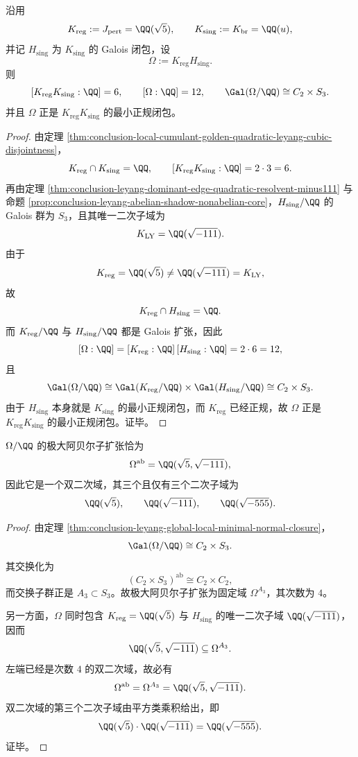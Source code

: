 \begin{theorem}\label{thm:conclusion-leyang-global-local-minimal-normal-closure}
沿用
\[
K_{\mathrm{reg}}:=J_{\mathrm{pert}}=\QQ(\sqrt5),
\qquad
K_{\mathrm{sing}}:=K_{\mathrm{br}}=\QQ(u),
\]
并记 \(H_{\mathrm{sing}}\) 为 \(K_{\mathrm{sing}}\) 的 Galois 闭包，设
\[
\Omega:=K_{\mathrm{reg}}H_{\mathrm{sing}}.
\]
则
\[
[K_{\mathrm{reg}}K_{\mathrm{sing}}:\QQ]=6,
\qquad
[\Omega:\QQ]=12,
\qquad
\Gal(\Omega/\QQ)\cong C_2\times S_3.
\]
并且 \(\Omega\) 正是 \(K_{\mathrm{reg}}K_{\mathrm{sing}}\) 的最小正规闭包。
\end{theorem}
\begin{proof}
由定理 \ref{thm:conclusion-local-cumulant-golden-quadratic-leyang-cubic-disjointness}，
\[
K_{\mathrm{reg}}\cap K_{\mathrm{sing}}=\QQ,
\qquad
[K_{\mathrm{reg}}K_{\mathrm{sing}}:\QQ]=2\cdot 3=6.
\]
再由定理 \ref{thm:conclusion-leyang-dominant-edge-quadratic-resolvent-minus111} 与命题 \ref{prop:conclusion-leyang-abelian-shadow-nonabelian-core}，\(H_{\mathrm{sing}}/\QQ\) 的 Galois 群为 \(S_3\)，且其唯一二次子域为
\[
K_{\mathrm{LY}}=\QQ(\sqrt{-111}).
\]
由于
\[
K_{\mathrm{reg}}=\QQ(\sqrt5)\neq \QQ(\sqrt{-111})=K_{\mathrm{LY}},
\]
故
\[
K_{\mathrm{reg}}\cap H_{\mathrm{sing}}=\QQ.
\]
而 \(K_{\mathrm{reg}}/\QQ\) 与 \(H_{\mathrm{sing}}/\QQ\) 都是 Galois 扩张，因此
\[
[\Omega:\QQ]=[K_{\mathrm{reg}}:\QQ]\,[H_{\mathrm{sing}}:\QQ]=2\cdot 6=12,
\]
且
\[
\Gal(\Omega/\QQ)\cong \Gal(K_{\mathrm{reg}}/\QQ)\times \Gal(H_{\mathrm{sing}}/\QQ)\cong C_2\times S_3.
\]
由于 \(H_{\mathrm{sing}}\) 本身就是 \(K_{\mathrm{sing}}\) 的最小正规闭包，而 \(K_{\mathrm{reg}}\) 已经正规，故 \(\Omega\) 正是 \(K_{\mathrm{reg}}K_{\mathrm{sing}}\) 的最小正规闭包。证毕。
\end{proof}

\begin{corollary}[最大全阿贝尔阴影与被迫出现的第三二次子域]\label{cor:conclusion-leyang-global-local-maximal-abelian-shadow}
\(\Omega/\QQ\) 的极大阿贝尔子扩张恰为
\[
\Omega^{\mathrm{ab}}=\QQ(\sqrt5,\sqrt{-111}),
\]
因此它是一个双二次域，其三个且仅有三个二次子域为
\[
\QQ(\sqrt5),\qquad
\QQ(\sqrt{-111}),\qquad
\QQ(\sqrt{-555}).
\]
\end{corollary}
\begin{proof}
由定理 \ref{thm:conclusion-leyang-global-local-minimal-normal-closure}，
\[
\Gal(\Omega/\QQ)\cong C_2\times S_3.
\]
其交换化为
\[
(C_2\times S_3)^{\mathrm{ab}}\cong C_2\times C_2,
\]
而交换子群正是 \(A_3\subset S_3\)。故极大阿贝尔子扩张为固定域 \(\Omega^{A_3}\)，其次数为 \(4\)。

另一方面，\(\Omega\) 同时包含 \(K_{\mathrm{reg}}=\QQ(\sqrt5)\) 与 \(H_{\mathrm{sing}}\) 的唯一二次子域 \(\QQ(\sqrt{-111})\)，因而
\[
\QQ(\sqrt5,\sqrt{-111})\subseteq \Omega^{A_3}.
\]
左端已经是次数 \(4\) 的双二次域，故必有
\[
\Omega^{\mathrm{ab}}=\Omega^{A_3}=\QQ(\sqrt5,\sqrt{-111}).
\]
双二次域的第三个二次子域由平方类乘积给出，即
\[
\QQ(\sqrt5)\cdot \QQ(\sqrt{-111})=\QQ(\sqrt{-555}).
\]
证毕。
\end{proof}

